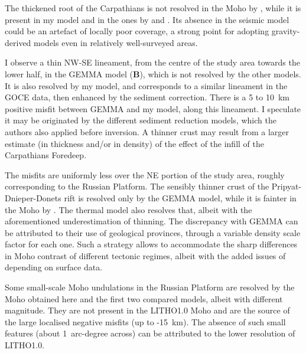 The thickened root of the Carpathians is not resolved in the Moho by \textcite{Grad2009}, while it is present in my model and in the ones by \textcite{Reguzzoni2015} and \textcite{Pasyanos2014}.
Its absence in the seismic model could be an artefact of locally poor coverage, a strong point for adopting gravity-derived models even in relatively well-surveyed areas.

I observe a thin NW-SE lineament, from the centre of the study area towards the lower half, in the GEMMA model (\textbf{B}), which is not resolved by the other models.
It is also resolved by my model, and corresponds to a similar lineament in the GOCE data, then enhanced by the sediment correction.
There is a 5 to 10~\si{\kilo \metre} positive misfit between GEMMA and my model, along this lineament.
I speculate it may be originated by the different sediment reduction models, which the authors also applied before inversion.
A thinner crust may result from a larger estimate (in thickness and/or in density) of the effect of the infill of the Carpathians Foredeep.

The misfits are uniformly less over the NE portion of the study area, roughly corresponding to the Russian Platform.
The sensibly thinner crust of the Pripyat-Dnieper-Donets rift is resolved only by the GEMMA model, while it is fainter in the Moho by \textcite{Grad2009}.
The thermal model also resolves that, albeit with the aforementioned underestimation of thinning.
The discrepancy with {GEMMA} can be attributed to their use of geological provinces, through a variable density scale factor for each one. Such a strategy allows to accommodate the sharp differences in Moho contrast of different tectonic regimes, albeit with the added issues of depending on surface data.

Some small-scale Moho undulations in the Russian Platform are resolved by the Moho obtained here and the first two compared models, albeit with different magnitude.
They are not present in the {LITHO1.0} Moho and are the source of the large localised negative misfits (up to -15~\si{\kilo \metre}).
The absence of such small features (about 1~arc-degree across) can be attributed to the lower resolution of {LITHO1.0}.

